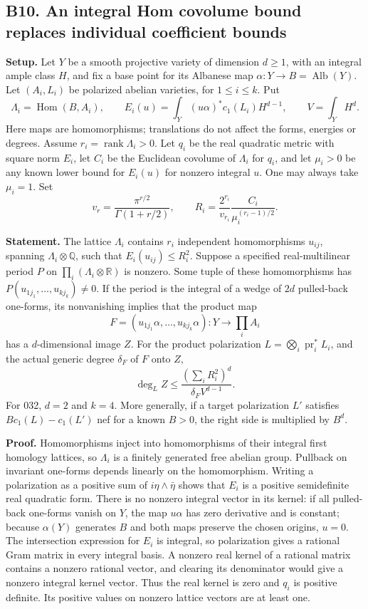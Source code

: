 \subsection{B10. An integral Hom covolume bound replaces individual coefficient bounds}\label{b10.-an-integral-hom-covolume-bound-replaces-individual-coefficient-bounds}

\textbf{Setup.} Let \(Y\) be a smooth projective variety of dimension \(d\ge1\), with an integral ample class \(H\), and fix a base point for its Albanese map \(\alpha:Y\to B=\operatorname{Alb}(Y)\). Let \((A_i,L_i)\) be polarized abelian varieties, for \(1\le i\le k\). Put \[
 \Lambda_i=\operatorname{Hom}(B,A_i),\qquad
 E_i(u)=\int_Y (u\alpha)^*c_1(L_i)H^{d-1},\qquad
 V=\int_YH^d.
\] Here maps are homomorphisms; translations do not affect the forms, energies or degrees. Assume \(r_i=\operatorname{rank}\Lambda_i>0\). Let \(q_i\) be the real quadratic metric with square norm \(E_i\), let \(C_i\) be the Euclidean covolume of \(\Lambda_i\) for \(q_i\), and let \(\mu_i>0\) be any known lower bound for \(E_i(u)\) for nonzero integral \(u\). One may always take \(\mu_i=1\). Set \[
 v_r=\frac{\pi^{r/2}}{\Gamma(1+r/2)},\qquad
 R_i=\frac{2^{r_i}}{v_{r_i}}\frac{C_i}{\mu_i^{(r_i-1)/2}}.
\]

\textbf{Statement.} The lattice \(\Lambda_i\) contains \(r_i\) independent homomorphisms \(u_{ij}\), spanning \(\Lambda_i\otimes\mathbb Q\), such that \(E_i(u_{ij})\le R_i^2\). Suppose a specified real-multilinear period \(P\) on \(\prod_i(\Lambda_i\otimes\mathbb R)\) is nonzero. Some tuple of these homomorphisms has \(P(u_{1j_1},\ldots,u_{kj_k})\ne0\). If the period is the integral of a wedge of \(2d\) pulled-back one-forms, its nonvanishing implies that the product map \[
 F=(u_{1j_1}\alpha,\ldots,u_{kj_k}\alpha):Y\longrightarrow\prod_i A_i
\] has a \(d\)-dimensional image \(Z\). For the product polarization \(L=\bigotimes_i\operatorname{pr}_i^*L_i\), and the actual generic degree \(\delta_F\) of \(F\) onto \(Z\), \[
 \deg_L Z\le\frac{(\sum_iR_i^2)^d}{\delta_F V^{d-1}}.
\tag{B10.1}
\] For 032, \(d=2\) and \(k=4\). More generally, if a target polarization \(L'\) satisfies \(B c_1(L)-c_1(L')\) nef for a known \(B>0\), the right side is multiplied by \(B^d\).

\textbf{Proof.} Homomorphisms inject into homomorphisms of their integral first homology lattices, so \(\Lambda_i\) is a finitely generated free abelian group. Pullback on invariant one-forms depends linearly on the homomorphism. Writing a polarization as a positive sum of \(i\eta\wedge\bar\eta\) shows that \(E_i\) is a positive semidefinite real quadratic form. There is no nonzero integral vector in its kernel: if all pulled-back one-forms vanish on \(Y\), the map \(u\alpha\) has zero derivative and is constant; because \(\alpha(Y)\) generates \(B\) and both maps preserve the chosen origins, \(u=0\). The intersection expression for \(E_i\) is integral, so polarization gives a rational Gram matrix in every integral basis. A nonzero real kernel of a rational matrix contains a nonzero rational vector, and clearing its denominator would give a nonzero integral kernel vector. Thus the real kernel is zero and \(q_i\) is positive definite. Its positive values on nonzero lattice vectors are at least one.

